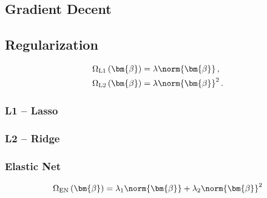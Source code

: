 \subsection{Gradient Decent}
\label{ml:general:gradDec}

\subsection{Regularization}
\label{ml:general:reg}

\begin{subequations} \label{eq:L1_L2}
\begin{align}
\Omega_{\text{L1}}\left(\bm{\beta}\right) &= \lambda \norm{\bm{\beta}}\,,     \label{eq:L1} \\
\Omega_{\text{L2}}\left(\bm{\beta}\right) &= \lambda \norm{\bm{\beta}}^{2}\,. \label{eq:L2}
\end{align}
\end{subequations}

\subsubsection{L1 -- Lasso}
\label{ml:general:reg:L1}

\subsubsection{L2 -- Ridge}
\label{ml:general:reg:L2}

\subsubsection{Elastic Net}
\label{ml:general:reg:L2}

\begin{equation} \label{eq:elastic_net}
\Omega_{\text{EN}}\left(\bm{\beta}\right) = \lambda_{1} \norm{\bm{\beta}} + \lambda_{2} \norm{\bm{\beta}}^{2}
\end{equation}

